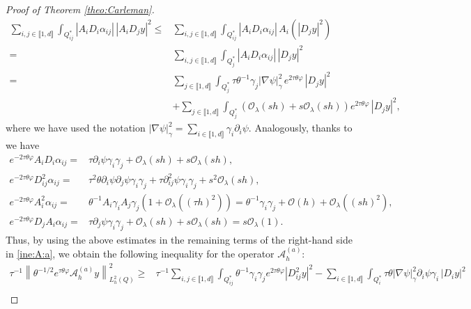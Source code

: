 \documentclass{amsart}
\numberwithin{equation}{section}
\begin{document}
\begin{proof}[Proof of Theorem \ref{theo:Carleman}]
\begin{equation*}
\begin{aligned}
  \sum_{i,j\in\llbracket 1,d\rrbracket} \int_{Q_{ij}^{\ast}} |A_{i}D_{i}\alpha_{ij}|\,|A_{i}D_{j}y|^{2}\leq&   \sum_{i,j\in\llbracket 1,d\rrbracket} \int_{Q_{ij}^{\ast}}|A_{i}D_{i}\alpha_{ij}|\,A_{i}(|D_{j}y|^{2})\\
  =&\sum_{i,j\in\llbracket 1,d\rrbracket}\int_{Q_{j}^{\ast}}|A_{i}D_{i}\alpha_{ij}|\,|D_{j}y|^{2}\\
  =&\sum_{j\in\llbracket 1,d\rrbracket}\int_{Q_{j}^{\ast}}\tau\theta^{-1}\gamma_{j} |\nabla\psi|_{\gamma}^{2}\,e^{2\tau\theta\varphi}\,|D_{j}y|^{2}\\
  &+\sum_{j\in\llbracket 1,d\rrbracket}\int_{Q^\ast_j}(\mathcal{O}_{\lambda}(sh)+s\mathcal{O}_{\lambda}(sh))e^{2\tau\theta\varphi}\,|D_{j}y|^{2},
  \end{aligned}
\end{equation*}
where we have used the notation $\displaystyle|\nabla \psi|^{2}_{\gamma}=\sum_{i\in\llbracket 1,d\rrbracket} \gamma_{i}\partial_{i}\psi$. Analogously, thanks to \cite[Theorem 3.5]{AA:perez:2024} we have
\begin{align*}
e^{-2\tau\theta\varphi}A_{i}D_{i}\alpha_{ij}=&\tau \partial_{i}\psi \gamma_{i}\gamma_{j}+\mathcal{O}_{\lambda}(sh)+s\mathcal{O}_{\lambda}(sh),\\
e^{-2\tau\theta\varphi}D_{ij}^{2}\alpha_{ij}=&\tau^{2}\theta\partial_{i}\psi\partial_{j}\psi \gamma_{i}\gamma_{j}+\tau\partial_{ij}^{2}\psi \gamma_{i}\gamma_{j}+s^{2}\mathcal{O}_{\lambda}(sh),\\
e^{-2\tau\theta\varphi}A^{2}_{i}\alpha_{ij}=&\theta^{-1}A_{i}\gamma_{i}A_{j}\gamma_{j}(1+\mathcal{O}_{\lambda}((\tau h)^{2}))=\theta^{-1} \gamma_{i}\gamma_{j}+\mathcal{O}(h)+\mathcal{O}_{\lambda}((sh)^{2}),\\
e^{-2\tau\theta\varphi}D_{j}A_{i}\alpha_{ij}=&\tau \partial_{j}\psi \gamma_{i}\gamma_{j}+\mathcal{O}_{\lambda}(sh)+s\mathcal{O}_{\lambda}(sh)=s\mathcal{O}_{\lambda}(1).
\end{align*}
Thus, by using the above estimates in the remaining terms of the right-hand side in \eqref{ine:A:a}, we obtain the following inequality for the operator $\mathcal{A}_{h}^{(a)}$:
\begin{equation}\label{ine:A:a:2}
    \begin{aligned}
\tau^{-1}\left\|\theta^{-1/2}e^{\tau\theta\varphi}\mathcal{A}_{h}^{(a)}y\right\|^{2}_{L_{h}^{2}(Q)}\geq &\tau^{-1}\sum_{i,j\in\llbracket 1,d\rrbracket}\int_{Q_{ij}^{\ast}} \theta^{-1}\gamma_{i}\gamma_{j}e^{2\tau\theta\varphi}|D^{2}_{ij}y|^{2}-\sum_{i\in\llbracket 1,d\rrbracket}\int_{Q_{i}^{\ast}} \tau\theta|\nabla\psi|^{2}_{\gamma}\partial_{i}\psi\gamma_{i}\,|D_{i}y|^{2}\\

\end{aligned}
\end{equation}
\end{proof}
\end{document}

